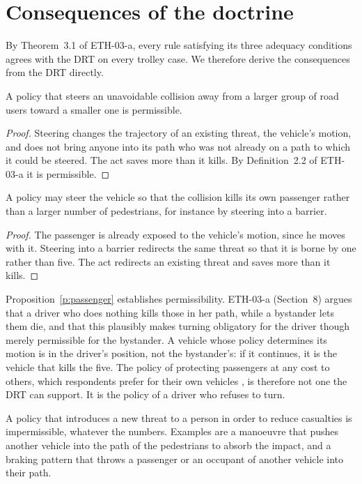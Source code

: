 \documentclass{situationist-preprint}
\begin{document}
\section{Consequences of the doctrine}

By Theorem~3.1 of ETH-03-a, every rule satisfying its three adequacy conditions agrees with the DRT on every trolley case. We therefore derive the consequences from the DRT directly.

\begin{proposition}\label{p:swerve}
A policy that steers an unavoidable collision away from a larger group of road users toward a smaller one is permissible.
\end{proposition}

\begin{proof}
Steering changes the trajectory of an existing threat, the vehicle's motion, and does not bring anyone into its path who was not already on a path to which it could be steered. The act saves more than it kills. By Definition~2.2 of ETH-03-a it is permissible.
\end{proof}

\begin{proposition}\label{p:passenger}
A policy may steer the vehicle so that the collision kills its own passenger rather than a larger number of pedestrians, for instance by steering into a barrier.
\end{proposition}

\begin{proof}
The passenger is already exposed to the vehicle's motion, since he moves with it. Steering into a barrier redirects the same threat so that it is borne by one rather than five. The act redirects an existing threat and saves more than it kills.
\end{proof}

Proposition~\ref{p:passenger} establishes permissibility. ETH-03-a (Section~8) argues that a driver who does nothing kills those in her path, while a bystander lets them die, and that this plausibly makes turning obligatory for the driver though merely permissible for the bystander. A vehicle whose policy determines its motion is in the driver's position, not the bystander's: if it continues, it is the vehicle that kills the five. The policy of protecting passengers at any cost to others, which respondents prefer for their own vehicles \citep{Bonnefon2016}, is therefore not one the DRT can support. It is the policy of a driver who refuses to turn.

\begin{proposition}\label{p:shield}
A policy that introduces a new threat to a person in order to reduce casualties is impermissible, whatever the numbers. Examples are a manoeuvre that pushes another vehicle into the path of the pedestrians to absorb the impact, and a braking pattern that throws a passenger or an occupant of another vehicle into their path.
\end{proposition}
\end{document}
